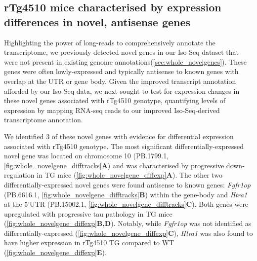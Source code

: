 \clearpage
\subsection{rTg4510 mice characterised by expression differences in novel, antisense genes}
Highlighting the power of long-reads to comprehensively annotate the transcriptome, we previously detected novel genes in our Iso-Seq dataset that were not present in existing genome annotations(\cref{sec:whole_novelgenes}). These genes were often lowly-expressed and typically antisense to known genes with overlap at the UTR or gene body. Given the improved transcript annotation afforded by our Iso-Seq data, we next sought to test for expression changes in these novel genes associated with rTg4510 genotype, quantifying levels of expression by mapping RNA-seq reads to our improved Iso-Seq-derived transcriptome annotation. 

We identified 3 of these novel genes with evidence for differential expression associated with rTg4510 genotype. The most significant differentially-expressed novel gene was located on chromosome 10 (PB.1799.1, \cref{fig:whole_novelgene_difftracks}\textbf{A}) and was characterised by progressive down-regulation in TG mice (\cref{fig:whole_novelgene_diffexp}\textbf{A}). The other two differentially-expressed novel genes were found antisense to known genes: \textit{Fgfr1op} (PB.6616.1, \cref{fig:whole_novelgene_difftracks}\textbf{B}) within the gene-body and \textit{Htra1} at the 5'UTR (PB.15002.1, \cref{fig:whole_novelgene_difftracks}\textbf{C}). Both genes were upregulated with progressive tau pathology in TG mice (\cref{fig:whole_novelgene_diffexp}\textbf{B,D}). Notably, while \textit{Fgfr1op} was not identified as differentially-expressed (\cref{fig:whole_novelgene_diffexp}\textbf{C}), \textit{Htra1} was also found to have higher expression in rTg4510 TG compared to WT (\cref{fig:whole_novelgene_diffexp}\textbf{E}).     

